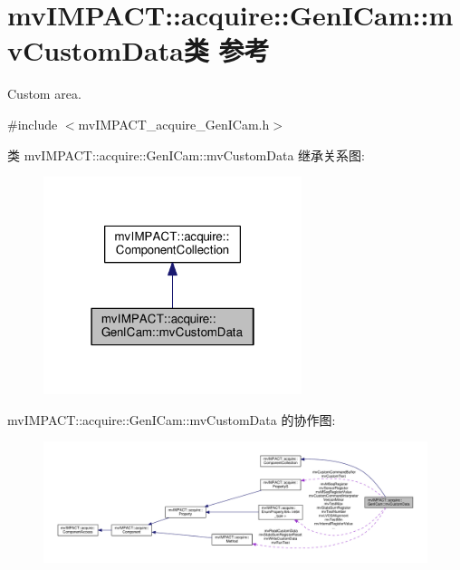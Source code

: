 \hypertarget{classmv_i_m_p_a_c_t_1_1acquire_1_1_gen_i_cam_1_1mv_custom_data}{\section{mv\+I\+M\+P\+A\+C\+T\+:\+:acquire\+:\+:Gen\+I\+Cam\+:\+:mv\+Custom\+Data类 参考}
\label{classmv_i_m_p_a_c_t_1_1acquire_1_1_gen_i_cam_1_1mv_custom_data}
}


Custom area.  




{\ttfamily \#include $<$mv\+I\+M\+P\+A\+C\+T\+\_\+acquire\+\_\+\+Gen\+I\+Cam.\+h$>$}



类 mv\+I\+M\+P\+A\+C\+T\+:\+:acquire\+:\+:Gen\+I\+Cam\+:\+:mv\+Custom\+Data 继承关系图\+:
\nopagebreak
\begin{figure}[H]
\begin{center}
\leavevmode
\includegraphics[width=214pt]{classmv_i_m_p_a_c_t_1_1acquire_1_1_gen_i_cam_1_1mv_custom_data__inherit__graph}
\end{center}
\end{figure}


mv\+I\+M\+P\+A\+C\+T\+:\+:acquire\+:\+:Gen\+I\+Cam\+:\+:mv\+Custom\+Data 的协作图\+:
\nopagebreak
\begin{figure}[H]
\begin{center}
\leavevmode
\includegraphics[width=350pt]{classmv_i_m_p_a_c_t_1_1acquire_1_1_gen_i_cam_1_1mv_custom_data__coll__graph}
\end{center}
\end{figure}
